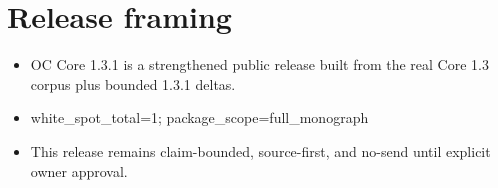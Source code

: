 \section*{Release framing}
\begin{itemize}[leftmargin=*]
\item OC Core 1.3.1 is a strengthened public release built from the real Core 1.3 corpus plus bounded 1.3.1 deltas.
\item white\_spot\_total=1; package\_scope=full\_monograph
\item This release remains claim-bounded, source-first, and no-send until explicit owner approval.
\end{itemize}
